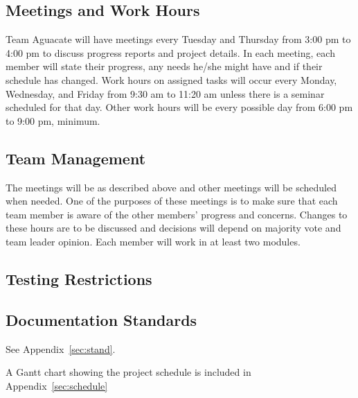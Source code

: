 
\subsection{Meetings and Work Hours}
Team Aguacate will have meetings every Tuesday and Thursday from 3:00 pm to 4:00 pm to discuss progress reports and project details. In each meeting, each member will state their progress, any needs he/she might have and if their schedule has changed. Work hours on assigned tasks will occur every Monday, Wednesday, and Friday from 9:30 am to 11:20 am unless there is a seminar scheduled for that day. Other work hours will be every possible day from 6:00 pm to 9:00 pm, minimum.

\subsection{Team Management}
The meetings will be as described above and other meetings will be scheduled when needed. One of the purposes of these meetings is to make sure that each team member is aware of the other members' progress and concerns. Changes to these hours are to be discussed and decisions will depend on majority vote and team leader opinion. Each member will work in at least two modules.

\subsection{Testing Restrictions}

\subsection{Documentation Standards}
See Appendix~\ref{sec:stand}.

A Gantt chart showing the project schedule is included in Appendix~\ref{sec:schedule} 